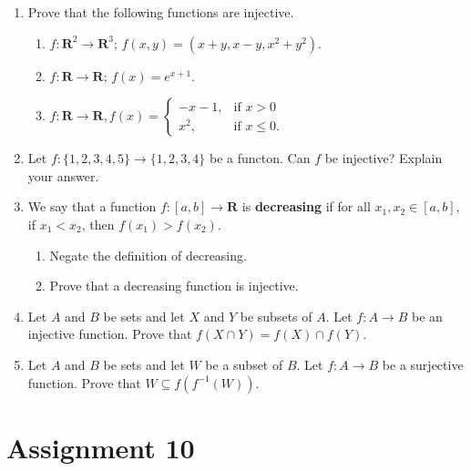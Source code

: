 \documentclass[12pt]{article}
\begin{document}
\begin{enumerate}
\begin{enumerate}
 \end{enumerate}

\item Prove that the following functions are injective.
  \begin{enumerate}
  \item $f\colon \mathbf{R}^2 \to \mathbf{R}^3;\, f(x,y) =  (x+y,x-y,x^2 + y^2)$.
  \item $f \colon \mathbf{R} \to \mathbf{R};\, f(x) = e^{x+1}$.
\item $f\colon \mathbf{R}\to \mathbf{R}, f(x) =
 \begin{cases}
 -x-1, & \text{if $x > 0$} \\
 x^2, & \text{if $x \leq 0$}.
 \end{cases}
 $
\end{enumerate}

\item Let $f\colon \{1,2,3,4,5\} \to \{1,2,3,4\}$ be a functon. Can $f$ be injective? Explain your answer.  

\item We say that a function $f\colon [a,b] \to \mathbf{R}$ is \textbf{decreasing} if for all $x_1,x_2 \in [a,b]$, if $x_1 < x_2$, then $f(x_1) > f(x_2)$.
 \begin{enumerate}
 \item Negate the definition of decreasing.
 \item Prove that a decreasing function is injective.
 \end{enumerate}
 
\item Let $A$ and $B$ be sets and let $X$ and $Y$ be subsets of $A$. Let $f \colon A \to B$ be an injective function. Prove that $f(X \cap Y) = f(X) \cap f(Y)$.

\item Let $A$ and $B$ be sets and let $W$ be a subset of $B$. Let $f \colon A \to B$ be a surjective function. Prove that $W \subseteq f(f^{-1}(W))$.

\end{enumerate}

\newpage
\section[10 (due \csname dateWeek10\endcsname): Composition of functions.]{Assignment 10}
\end{document}
